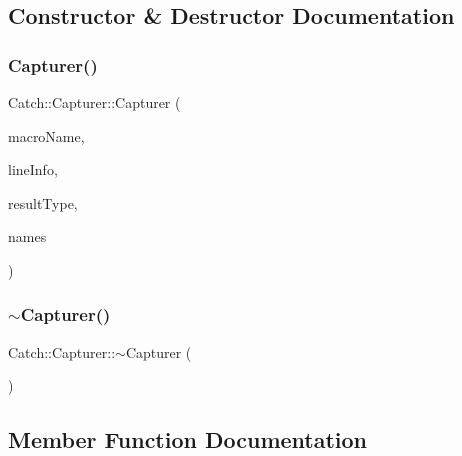\subsection{Constructor \& Destructor Documentation}
\mbox{\label{class_catch_1_1_capturer_a86b0b27acc803a4e1310c10820f3038f}} 
\subsubsection{\texorpdfstring{Capturer()}{Capturer()}}
{\footnotesize\ttfamily Catch\+::\+Capturer\+::\+Capturer (\begin{DoxyParamCaption}\item[{\mbox{\hyperlink{class_catch_1_1_string_ref}{String\+Ref}}}]{macro\+Name,  }\item[{\mbox{\hyperlink{struct_catch_1_1_source_line_info}{Source\+Line\+Info}} const \&}]{line\+Info,  }\item[{\mbox{\hyperlink{struct_catch_1_1_result_was_a624e1ee3661fcf6094ceef1f654601ef}{Result\+Was\+::\+Of\+Type}}}]{result\+Type,  }\item[{\mbox{\hyperlink{class_catch_1_1_string_ref}{String\+Ref}}}]{names }\end{DoxyParamCaption})}

\mbox{\label{class_catch_1_1_capturer_aecde85cf69e65565cec91e325a657b82}} 
\subsubsection{\texorpdfstring{$\sim$Capturer()}{~Capturer()}}
{\footnotesize\ttfamily Catch\+::\+Capturer\+::$\sim$\+Capturer (\begin{DoxyParamCaption}{ }\end{DoxyParamCaption})}



\subsection{Member Function Documentation}
\mbox{\label{class_catch_1_1_capturer_a0695ebf77f7cdcb344c73bcb3d9131e4}} 
